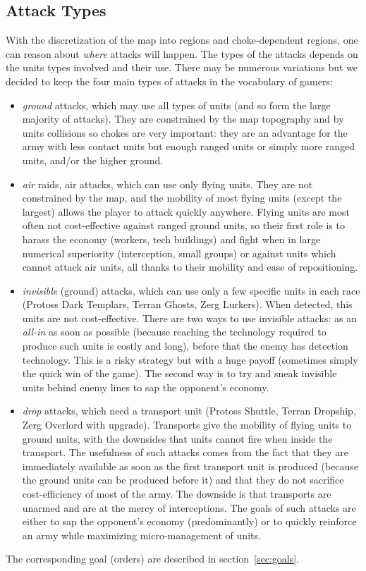 \subsection{Attack Types}
\label{sec:attacktypes}
With the discretization of the map into regions and choke-dependent regions, one can reason about \textit{where} attacks will happen. The types of the attacks depends on the units types involved and their use. There may be numerous variations but we decided to keep the four main types of attacks in the vocabulary of gamers:
\begin{itemize}
    \item \textit{ground} attacks, which may use all types of units (and so form the large majority of attacks). They are constrained by the map topography and by units collisions so chokes are very important: they are an advantage for the army with less contact units but enough ranged units or simply more ranged units, and/or the higher ground. 
    \item \textit{air} raids, air attacks, which can use only flying units. They are not constrained by the map, and the mobility of most flying units (except the largest) allows the player to attack quickly anywhere. Flying units are most often not cost-effective against ranged ground units, so their first role is to harass the economy (workers, tech buildings) and fight when in large numerical superiority (interception, small groups) or against units which cannot attack air units, all thanks to their mobility and ease of repositioning.
    \item \textit{invisible} (ground) attacks, which can use only a few specific units in each race (Protoss Dark Templars, Terran Ghosts, Zerg Lurkers). When detected, this units are not cost-effective. There are two ways to use invisible attacks: as an \textit{all-in} as soon as possible (because reaching the technology required to produce such units is costly and long), before that the enemy has detection technology. This is a risky strategy but with a huge payoff (sometimes simply the quick win of the game). The second way is to try and sneak invisible units behind enemy lines to sap the opponent's economy.
    \item \textit{drop} attacks, which need a transport unit (Protoss Shuttle, Terran Dropship, Zerg Overlord with upgrade). Transports give the mobility of flying units to ground units, with the downsides that units cannot fire when inside the transport. The usefulness of such attacks comes from the fact that they are immediately available as soon as the first transport unit is produced (because the ground units can be produced before it) and that they do not sacrifice cost-efficiency of most of the army. The downside is that transports are unarmed and are at the mercy of interceptions. The goals of such attacks are either to sap the opponent's economy (predominantly) or to quickly reinforce an army while maximizing micro-management of units.
\end{itemize}
The corresponding goal (orders) are described in section~\ref{sec:goals}.


